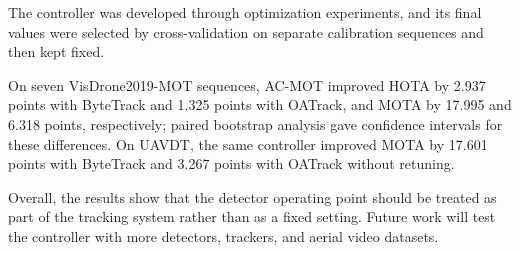 \documentclass[pdflatex,sn-mathphys-num,iicol]{sn-jnl}
\begin{document}
The controller was developed through optimization experiments, and its final
values were selected by cross-validation on separate calibration sequences and
then kept fixed.

On seven VisDrone2019-MOT sequences, AC-MOT improved HOTA by 2.937 points with
ByteTrack and 1.325 points with OATrack, and MOTA by 17.995 and 6.318 points,
respectively; paired bootstrap analysis gave confidence intervals for these
differences. On UAVDT, the same controller improved MOTA by 17.601 points with
ByteTrack and 3.267 points with OATrack without retuning.

Overall, the results show that the detector operating point should be treated
as part of the tracking system rather than as a fixed setting. Future work
will test the controller with more detectors, trackers, and aerial video
datasets.

\backmatter


\end{document}
